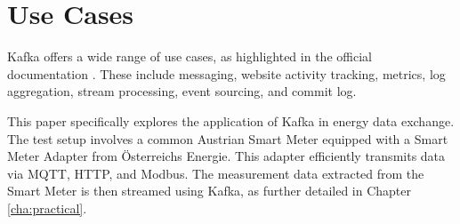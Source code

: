 \section{Use Cases}
\label{cha:use-cases}

Kafka offers a wide range of use cases, as highlighted in the official documentation \cite{kafkaDoc}. These include messaging, website activity tracking, metrics, log aggregation, stream processing, event sourcing, and commit log. 

This paper specifically explores the application of Kafka in energy data exchange. The test setup involves a common Austrian Smart Meter equipped with a Smart Meter Adapter from Österreichs Energie. This adapter efficiently transmits data via MQTT, HTTP, and Modbus. The measurement data extracted from the Smart Meter is then streamed using Kafka, as further detailed in Chapter \ref{cha:practical}.